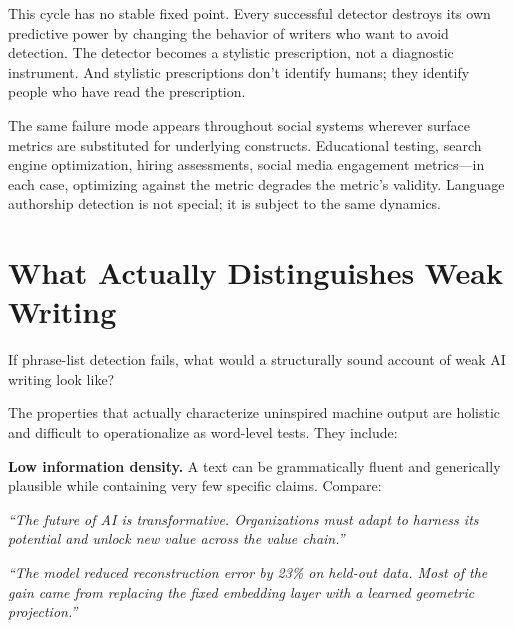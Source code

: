 \documentclass[12pt]{article}
\begin{document}
This cycle has no stable fixed point. Every successful detector destroys its own predictive power by changing the behavior of writers who want to avoid detection. The detector becomes a stylistic prescription, not a diagnostic instrument. And stylistic prescriptions don't identify humans; they identify people who have read the prescription.

The same failure mode appears throughout social systems wherever surface metrics are substituted for underlying constructs. Educational testing, search engine optimization, hiring assessments, social media engagement metrics---in each case, optimizing against the metric degrades the metric's validity. Language authorship detection is not special; it is subject to the same dynamics.

\section{What Actually Distinguishes Weak Writing}

If phrase-list detection fails, what would a structurally sound account of weak AI writing look like?

The properties that actually characterize uninspired machine output are holistic and difficult to operationalize as word-level tests. They include:

\textbf{Low information density.} A text can be grammatically fluent and generically plausible while containing very few specific claims. Compare:

\begin{mdframed}[backgroundcolor=quoteblock,linewidth=0pt,innerleftmargin=12pt,innerrightmargin=12pt,innertopmargin=8pt,innerbottommargin=8pt]
\textit{``The future of AI is transformative. Organizations must adapt to harness its potential and unlock new value across the value chain.''}
\end{mdframed}

\vspace{0.5em}

\begin{mdframed}[backgroundcolor=quoteblock,linewidth=0pt,innerleftmargin=12pt,innerrightmargin=12pt,innertopmargin=8pt,innerbottommargin=8pt]
\textit{``The model reduced reconstruction error by 23\% on held-out data. Most of the gain came from replacing the fixed embedding layer with a learned geometric projection.''}
\end{mdframed}
\end{document}
